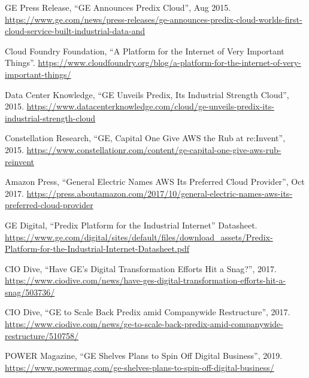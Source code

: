 \documentclass[12pt,a4paper]{article}
\newcommand{\sect}[1]{\vspace{12pt}{\Large\bfseries\color{blue!50!black}#1}\par\vspace{4pt}}
\begin{document}
\sect{7. Sources}
{\normalsize
\begin{enumerate}[label={[\arabic*]},leftmargin=2.2em,itemsep=6pt]
  \item GE Press Release, ``GE Announces Predix Cloud'', Aug 2015. \url{https://www.ge.com/news/press-releases/ge-announces-predix-cloud-worlds-first-cloud-service-built-industrial-data-and}
  \item Cloud Foundry Foundation, ``A Platform for the Internet of Very Important Things''. \url{https://www.cloudfoundry.org/blog/a-platform-for-the-internet-of-very-important-things/}
  \item Data Center Knowledge, ``GE Unveils Predix, Its Industrial Strength Cloud'', 2015. \url{https://www.datacenterknowledge.com/cloud/ge-unveils-predix-its-industrial-strength-cloud}
  \item Constellation Research, ``GE, Capital One Give AWS the Rub at re:Invent'', 2015. \url{https://www.constellationr.com/content/ge-capital-one-give-aws-rub-reinvent}
  \item Amazon Press, ``General Electric Names AWS Its Preferred Cloud Provider'', Oct 2017. \url{https://press.aboutamazon.com/2017/10/general-electric-names-aws-its-preferred-cloud-provider}
  \item GE Digital, ``Predix Platform for the Industrial Internet'' Datasheet. \url{https://www.ge.com/digital/sites/default/files/download_assets/Predix-Platform-for-the-Industrial-Internet-Datasheet.pdf}
  \item CIO Dive, ``Have GE's Digital Transformation Efforts Hit a Snag?'', 2017. \url{https://www.ciodive.com/news/have-ges-digital-transformation-efforts-hit-a-snag/503736/}
  \item CIO Dive, ``GE to Scale Back Predix amid Companywide Restructure'', 2017. \url{https://www.ciodive.com/news/ge-to-scale-back-predix-amid-companywide-restructure/510758/}
  \item POWER Magazine, ``GE Shelves Plans to Spin Off Digital Business'', 2019. \url{https://www.powermag.com/ge-shelves-plans-to-spin-off-digital-business/}
\end{enumerate}
}
\end{document}

